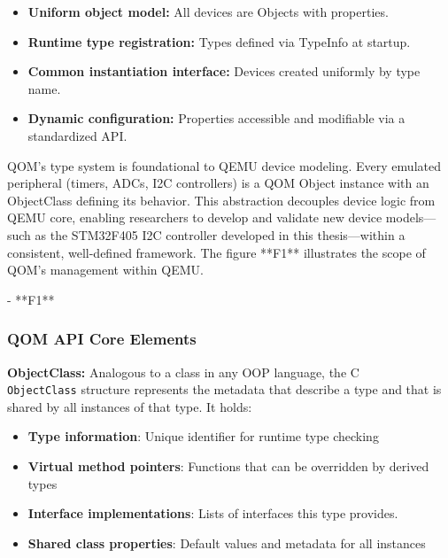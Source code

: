 \begin{itemize}
    \item \textbf{Uniform object model:             }All devices are Objects with properties.
    
    \item \textbf{Runtime type registration:        }Types defined via TypeInfo at startup.
    
    \item \textbf{Common instantiation interface:   }Devices created uniformly by type name.
    
    \item \textbf{Dynamic configuration:            }Properties accessible and modifiable via a 
                                                        standardized API.
\end{itemize}


QOM's type system is foundational to QEMU device modeling. Every 
emulated peripheral (timers, ADCs, I2C controllers) is a QOM Object instance with 
an ObjectClass defining its behavior. This abstraction decouples device logic from 
QEMU core, enabling researchers to develop and validate new device models—such 
as the STM32F405 I2C controller developed in this thesis—within a consistent, 
well-defined framework. The figure **F1** illustrates the scope of QOM's management 
within QEMU.

- **F1**

\subsubsection{QOM API Core Elements}

\textbf{ObjectClass:}\cite{Qemu_QOM_API} Analogous to a class in any OOP language, the C \\ 
\texttt{ObjectClass} structure represents the metadata that describe a type and that is 
shared by all instances of that type. It holds:

\begin{itemize}
    \item \textbf{Type information}: Unique identifier for runtime type checking
    \item \textbf{Virtual method pointers}: Functions that can be overridden by derived types
    \item \textbf{Interface implementations}: Lists of interfaces this type provides.
    \item \textbf{Shared class properties}: Default values and metadata for all instances
\end{itemize}

